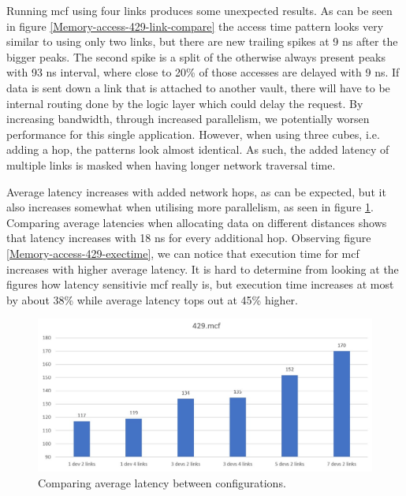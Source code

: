 Running mcf using four links produces some unexpected results. As can be seen in figure \ref{Memory-access-429-link-compare} the access time pattern looks very similar to using only two links, but there are new trailing spikes at 9 ns after the bigger peaks. The second spike is a split of the otherwise always present peaks with 93 ns interval, where close to 20\% of those accesses are delayed with 9 ns. If data is sent down a link that is attached to another vault, there will have to be internal routing done by the logic layer which could delay the request. By increasing bandwidth, through increased parallelism, we potentially worsen performance for this single application. However, when using three cubes, i.e. adding a hop, the patterns look almost identical. As such, the added latency of multiple links is masked when having longer network traversal time. 
\bigskip

Average latency increases with added network hops, as can be expected, but it also increases somewhat when utilising more parallelism, as seen in figure \ref{Memory-access-429-average-latency}. Comparing average latencies when allocating data on different distances shows that latency increases with 18 ns for every additional hop. Observing figure \ref{Memory-access-429-exectime}, we can notice that execution time for mcf increases with higher average latency. It is hard to determine from looking at the figures how latency sensitivie mcf really is, but execution time increases at most by about 38\% while average latency tops out at 45\% higher.

\begin{figure}[!ht]
    \centering
    \includegraphics[width=1.0\linewidth]{figure/429-averages.jpg}
    \caption{Comparing average latency between configurations.}
    \label{Memory-access-429-average-latency}
\end{figure}

